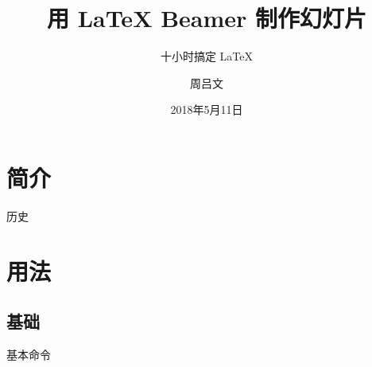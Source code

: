 \documentclass[red]{beamer}
\title[幻灯片制作]{用 LaTeX Beamer 制作幻灯片}
\subtitle{十小时搞定 LaTeX}
\author{周吕文}
\institute[超模]{超级数学建模}
\date{2018年5月11日}
\begin{document}
\begin{frame}[plain]{}
\titlepage
\end{frame}

\section{简介}
\begin{frame}{历史}

\end{frame}


\section{用法}
\subsection{基础}
\begin{frame}{基本命令}

\end{frame}
\end{document}
